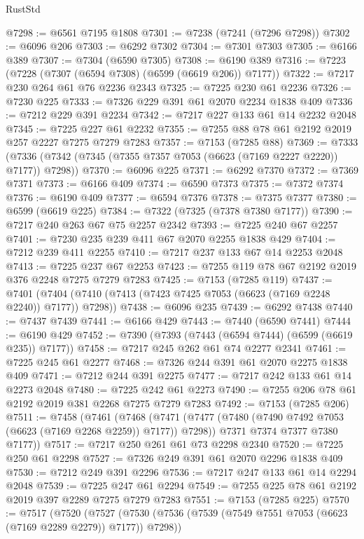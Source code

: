 \begin{lexlean}{RustStd}
\begin{coremodule}
@7298 := @6561 @7195 @1808
@7301 := @7238 (@7241 (@7296 @7298))
@7302 := @6096 @206
@7303 := @6292 @7302
@7304 := @7301 @7303
@7305 := @6166 @389
@7307 := @7304 (@6590 @7305)
@7308 := @6190 @389
@7316 := @7223 (@7228 (@7307 (@6594 @7308) (@6599 (@6619 @206)) @7177))
@7322 := @7217 @230 @264 @61 @76 @2236 @2343
@7325 := @7225 @230 @61 @2236
@7326 := @7230 @225
@7333 := @7326 @229 @391 @61 @2070 @2234 @1838 @409
@7336 := @7212 @229 @391 @2234
@7342 := @7217 @227 @133 @61 @14 @2232 @2048
@7345 := @7225 @227 @61 @2232
@7355 := @7255 @88 @78 @61 @2192 @2019 @257 @2227 @7275 @7279 @7283
@7357 := @7153 (@7285 @88)
@7369 := @7333 (@7336 (@7342 (@7345 (@7355 @7357 @7053 (@6623 (@7169 @2227 @2220)) @7177)) @7298))
@7370 := @6096 @225
@7371 := @6292 @7370
@7372 := @7369 @7371
@7373 := @6166 @409
@7374 := @6590 @7373
@7375 := @7372 @7374
@7376 := @6190 @409
@7377 := @6594 @7376
@7378 := @7375 @7377
@7380 := @6599 (@6619 @225)
@7384 := @7322 (@7325 (@7378 @7380 @7177))
@7390 := @7217 @240 @263 @67 @75 @2257 @2342
@7393 := @7225 @240 @67 @2257
@7401 := @7230 @235 @239 @411 @67 @2070 @2255 @1838 @429
@7404 := @7212 @239 @411 @2255
@7410 := @7217 @237 @133 @67 @14 @2253 @2048
@7413 := @7225 @237 @67 @2253
@7423 := @7255 @119 @78 @67 @2192 @2019 @376 @2248 @7275 @7279 @7283
@7425 := @7153 (@7285 @119)
@7437 := @7401 (@7404 (@7410 (@7413 (@7423 @7425 @7053 (@6623 (@7169 @2248 @2240)) @7177)) @7298))
@7438 := @6096 @235
@7439 := @6292 @7438
@7440 := @7437 @7439
@7441 := @6166 @429
@7443 := @7440 (@6590 @7441)
@7444 := @6190 @429
@7452 := @7390 (@7393 (@7443 (@6594 @7444) (@6599 (@6619 @235)) @7177))
@7458 := @7217 @245 @262 @61 @74 @2277 @2341
@7461 := @7225 @245 @61 @2277
@7468 := @7326 @244 @391 @61 @2070 @2275 @1838 @409
@7471 := @7212 @244 @391 @2275
@7477 := @7217 @242 @133 @61 @14 @2273 @2048
@7480 := @7225 @242 @61 @2273
@7490 := @7255 @206 @78 @61 @2192 @2019 @381 @2268 @7275 @7279 @7283
@7492 := @7153 (@7285 @206)
@7511 := @7458
    (@7461
      (@7468
        (@7471 (@7477 (@7480 (@7490 @7492 @7053 (@6623 (@7169 @2268 @2259)) @7177)) @7298))
        @7371
        @7374
        @7377
        @7380
        @7177))
@7517 := @7217 @250 @261 @61 @73 @2298 @2340
@7520 := @7225 @250 @61 @2298
@7527 := @7326 @249 @391 @61 @2070 @2296 @1838 @409
@7530 := @7212 @249 @391 @2296
@7536 := @7217 @247 @133 @61 @14 @2294 @2048
@7539 := @7225 @247 @61 @2294
@7549 := @7255 @225 @78 @61 @2192 @2019 @397 @2289 @7275 @7279 @7283
@7551 := @7153 (@7285 @225)
@7570 := @7517
    (@7520
      (@7527
        (@7530 (@7536 (@7539 (@7549 @7551 @7053 (@6623 (@7169 @2289 @2279)) @7177)) @7298))

\end{coremodule}
\end{lexlean}
